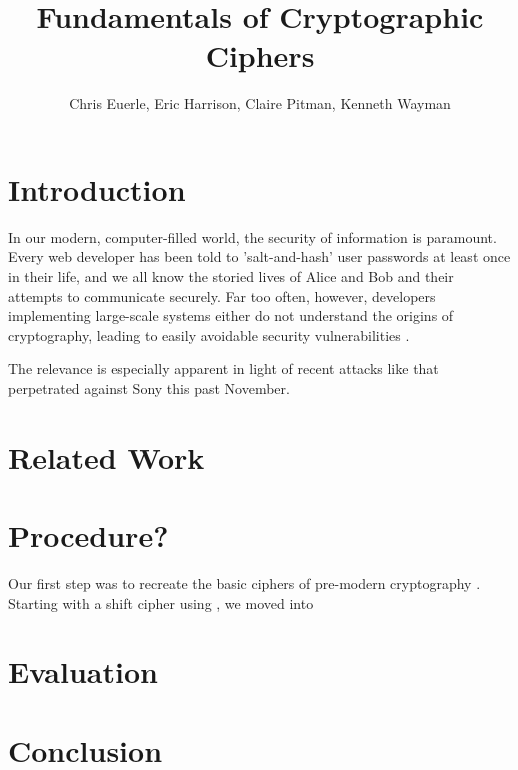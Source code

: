 \documentclass[11pt]{article}
\title{\textbf{Fundamentals of Cryptographic Ciphers}}
\author{Chris Euerle, Eric Harrison, Claire Pitman, Kenneth Wayman}
\date{}
\begin{document}
\maketitle

\section{Introduction}

\hspace{4mm} In our modern, computer-filled world, the security of information is paramount. Every web developer has been told to 'salt-and-hash' user passwords at least once in their life, and we all know the storied lives of Alice and Bob and their attempts to communicate securely.  Far too often, however, developers implementing large-scale systems either do not understand the origins of cryptography, leading to easily avoidable security vulnerabilities \cite{Software-Security}.

\vspace{3mm}

The relevance is especially apparent in light of recent attacks like that perpetrated against Sony this past November.  

\section{Related Work}

\section{Procedure?}
\hspace{4mm}	Our first step was to recreate the basic ciphers of pre-modern cryptography \cite{Alice-and-Bob}.  Starting with a shift cipher using , we moved into 
\section{Evaluation}

\section{Conclusion}


{}

\end{document}
